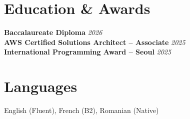 \documentclass[a4paper,10pt]{article}
\begin{document}
\section{Education \& Awards}
\textbf{Baccalaureate Diploma} \hfill \textit{2026}\\
\textbf{AWS Certified Solutions Architect -- Associate} \hfill \textit{2025}\\
\textbf{International Programming Award -- Seoul} \hfill \textit{2025}

\section{Languages}
English (Fluent), French (B2), Romanian (Native)
\end{document}
